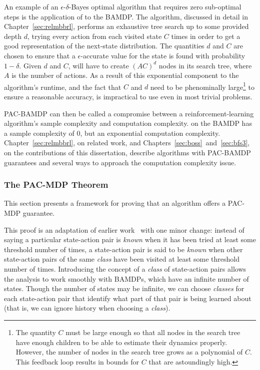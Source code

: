 An example of an $\epsilon$-$\delta$-Bayes optimal algorithm that requires zero sub-optimal steps is the application of  to the BAMDP. The  algorithm, discussed in detail in Chapter~\ref{sec:relmbbrl}, performs an exhaustive tree search up to some provided depth $d$, trying every action from each visited state $C$ times in order to get a good representation of the next-state distribution. The quantities $d$ and $C$ are chosen to ensure that a $\epsilon$-accurate value for the state is found with probability $1-\delta$. Given $d$ and $C$,  will have to create $(A C)^d$ nodes in its search tree, where $A$ is the number of actions. As a result of this exponential component to the algorithm's runtime, and the fact that $C$ and $d$ need to be phenominally large\footnote{The quantity $C$ must be large enough so that all nodes in the search tree have enough children to be able to estimate their dynamics properly. However, the number of nodes in the search tree grows as a polynomial of $C$. This feedback loop results in bounds for $C$ that are astoundingly high.} to ensure a reasonable accuracy,  is impractical to use even in most trivial problems.

PAC-BAMDP can then be called a compromise between a reinforcement-learning algorithm's sample complexity and computation complexity.  on the BAMDP has a sample complexity of $0$, but an exponential computation complexity. Chapter~\ref{sec:relmbbrl}, on related work, and Chapters~\ref{sec:boss}~and~\ref{sec:bfs3}, on the contributions of this dissertation, describe algorithms with PAC-BAMDP guarantees and several ways to approach the computation complexity issue.

\subsubsection{The PAC-MDP Theorem}
\label{sec:intro:pacmdp-theorem}

This section presents a framework for proving that an algorithm offers a PAC-MDP guarantee.

This proof is an adaptation of earlier work~\cite{lihong09pacmdp,kearns02} with one minor change: instead of saying a particular state-action pair is \emph{known} when it has been tried at least some threshold number of times, a state-action pair is said to be \emph{known} when other state-action pairs of the same \emph{class} have been visited at least some threshold number of times. Introducing the concept of a \emph{class} of state-action pairs allows the analysis to work smoothly with BAMDPs, which have an infinite number of states. Though the number of states may be infinite, we can choose \emph{classes} for each state-action pair that identify what part of that pair is being learned about (that is, we can ignore history when choosing a \emph{class}).

